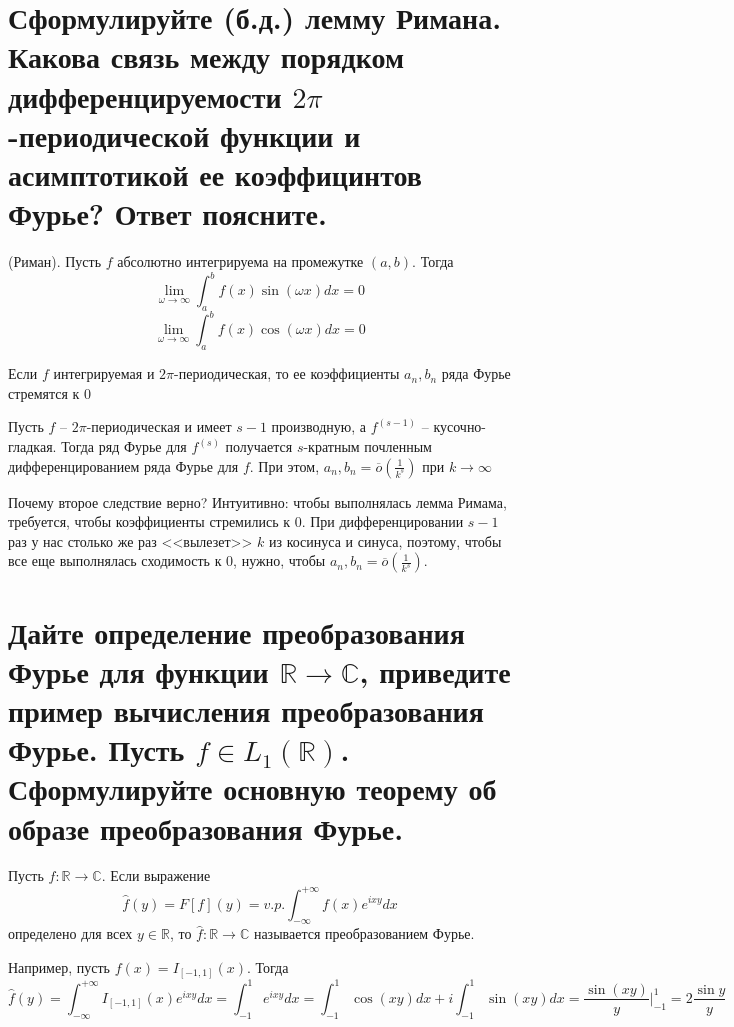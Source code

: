 \setcounter{section}{7}
\section{Сформулируйте (б.д.) лемму Римана. Какова связь между порядком дифференцируемости $2\pi$-периодической функции и асимптотикой ее коэффицинтов Фурье? Ответ поясните.}
\begin{lemma} (Риман).
    Пусть $f$ абсолютно интегрируема на промежутке $(a, b)$. Тогда
    $$
        \lim\limits_{\omega\to\infty}\int_{a}^{b}f(x)\sin(\omega x)dx = 0
    $$
    $$
        \lim\limits_{\omega\to\infty}\int_{a}^{b}f(x)\cos(\omega x)dx = 0
    $$
\end{lemma}

\begin{corollary}
    Если $f$ интегрируемая и $2\pi$-периодическая, то ее коэффициенты $a_n, b_n$ ряда Фурье стремятся к 0
\end{corollary}

\begin{corollary}
    Пусть $f$ -- $2\pi$-периодическая и имеет $s - 1$ производную, а $f^{(s - 1)}$ -- кусочно-гладкая. Тогда ряд Фурье для $f^{(s)}$ получается $s$-кратным почленным дифференцированием ряда Фурье для $f$. При этом, $a_n, b_n = \overline{o}\left(\frac{1}{k^s}\right)$ при $k\to\infty$
\end{corollary}
Почему второе следствие верно? Интуитивно: чтобы выполнялась лемма Римама, требуется, чтобы коэффициенты стремились к 0. При дифференцировании $s - 1$ раз у нас столько же раз <<вылезет>> $k$ из косинуса и синуса, поэтому, чтобы все еще выполнялась сходимость к 0, нужно, чтобы $a_n, b_n = \overline{o}\left(\frac{1}{k^s}\right)$.

\section{Дайте определение преобразования Фурье для функции $\mathbb{R}\to\mathbb{C}$, приведите пример вычисления преобразования Фурье. Пусть $f\in L_1(\mathbb{R})$. Сформулируйте основную теорему об образе преобразования Фурье.}
\begin{definition}
    Пусть $f\colon\mathbb{R}\to\mathbb{C}$. Если выражение $$\hat{f}(y) = F[f](y) = v.p.\int_{-\infty}^{+\infty}f(x)e^{ixy}dx$$ определено для всех $y\in\mathbb{R}$, то $\hat{f}\colon\mathbb{R}\to\mathbb{C}$ называется преобразованием Фурье.
\end{definition}

Например, пусть $f(x) = I_{[-1, 1]}(x)$. Тогда
$$
    \hat{f}(y) = \int_{-\infty}^{+\infty}I_{[-1, 1]}(x)e^{ixy}dx = \int_{-1}^{1}e^{ixy}dx = \int_{-1}^{1}\cos(xy)dx + i\int_{-1}^{1}\sin(xy)dx = \frac{\sin(xy)}{y}\Big|_{-1}^{1} = 2\frac{\sin y}{y}
$$

